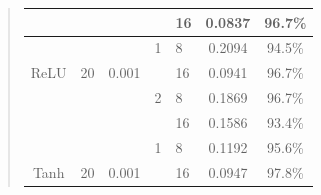 \documentclass{article}
\begin{document}
\begin{quote}
\begin{table}[h]
\begin{tabular}{|c|c|c|c|l|c|c|}
			\multicolumn{1}{|l|}{}                                        & \multicolumn{1}{l|}{} & \multicolumn{1}{l|}{}                                   & \multicolumn{1}{l|}{}                                   & 16                                                                             & 0.0837                                                    & 96.7\%                                                   \\ \hline
			&                       &                                                         & 1                                                       & 8                                                                              & 0.2094                                                    & 94.5\%                                                   \\ \cline{5-7} 
			ReLU                                                          & 20                    & 0.001                                                   &                                                         & 16                                                                             & 0.0941                                                    & 96.7\%                                                   \\ \cline{4-7} 
			&                       &                                                         & 2                                                       & 8                                                                              & 0.1869                                                    & 96.7\%                                                   \\ \cline{5-7} 
			\multicolumn{1}{|l|}{}                                        & \multicolumn{1}{l|}{} & \multicolumn{1}{l|}{}                                   & \multicolumn{1}{l|}{}                                   & 16                                                                             & 0.1586                                                    & 93.4\%                                                   \\ \hline
			&                       &                                                         & 1                                                       & 8                                                                              & 0.1192                                                    & 95.6\%                                                   \\ \cline{5-7} 
			Tanh                                                          & 20                    & 0.001                                                   &                                                         & 16                                                                             & 0.0947                                                    & 97.8\%                                                   \\ \cline{4-7} 

\end{tabular}
\end{table}
\end{quote}
\end{document}
